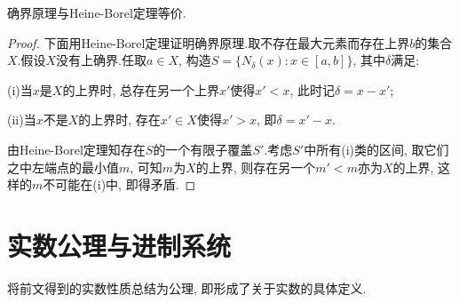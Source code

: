 \begin{proposition}{}
	确界原理与Heine-Borel定理等价.
\end{proposition}
\begin{proof}
	下面用Heine-Borel定理证明确界原理.取不存在最大元素而存在上界$b$的集合$X$.假设$X$没有上确界.任取$a \in X$, 构造$S=\{ N_{\delta}(x): x \in [a, b] \}$, 其中$\delta$满足: 
	
	(i)当$x$是$X$的上界时, 总存在另一个上界$x'$使得$x'<x$, 此时记$\delta =x-x'$; 
	
	(ii)当$x$不是$X$的上界时, 存在$x' \in X$使得$x'>x$, 即$\delta = x'-x$.
	
	由Heine-Borel定理知存在$S$的一个有限子覆盖$S'$.考虑$S'$中所有(i)类的区间, 取它们之中左端点的最小值$m$, 可知$m$为$X$的上界, 则存在另一个$m'<m$亦为$X$的上界, 这样的$m$不可能在(i)中, 即得矛盾.
\end{proof}

\newpage
\section{实数公理与进制系统}

将前文得到的实数性质总结为公理, 即形成了关于实数的具体定义.

